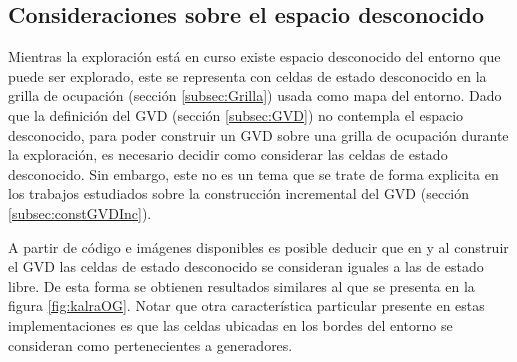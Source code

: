 \subsection{Consideraciones sobre el espacio desconocido}\label{subsec:espDesc}

Mientras la exploración está en curso existe espacio desconocido del entorno
que puede ser explorado, este se representa con celdas de estado desconocido en
la grilla de ocupación (sección \ref{subsec:Grilla}) usada como mapa del
entorno. Dado que la definición del GVD (sección \ref{subsec:GVD}) no contempla
el espacio desconocido, para poder construir un GVD sobre una grilla de
ocupación durante la exploración, es necesario decidir como considerar las
celdas de estado desconocido.
Sin embargo, este no es un tema que se trate de forma explicita en los trabajos
estudiados sobre la construcción incremental del GVD (sección \ref{subsec:constGVDInc}). 

A partir de código e imágenes disponibles es posible deducir que en
\cite{kalra2009incremental} y \cite{Lau2013} al construir el GVD las celdas de
estado desconocido se consideran iguales a las de estado libre. De esta
forma se obtienen resultados similares al que se presenta en la figura
\ref{fig:kalraOG}. Notar que otra característica particular presente en estas
implementaciones es que las celdas ubicadas en los bordes del entorno se
consideran como pertenecientes a generadores.

